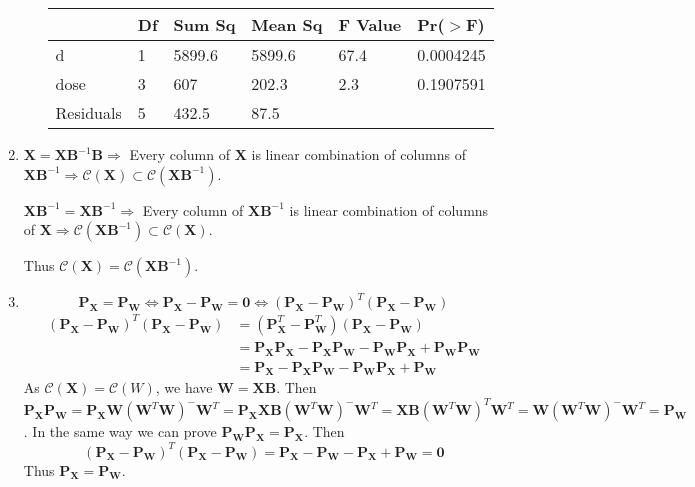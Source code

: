 \documentclass{article}
\begin{document}
\begin{enumerate}[leftmargin = 0 em, label = \arabic*., font = \bfseries]
\begin{enumerate}
	\begin{center}
	\begin{tabular}{llllll}
		\toprule
		& Df & Sum Sq & Mean Sq & F Value & Pr($>$F)\\
		\midrule
	  d & 1 & 5899.6 & 5899.6 & 67.4 & 0.0004245\\
	  dose & 3 & 607 & 202.3 & 2.3 & 0.1907591\\
	  Residuals & 5 & 432.5 & 87.5 & & \\
	  \bottomrule
	\end{tabular}
	\end{center}

	\end{enumerate}

	\item 
	$\bm X = \bm X \bm B^{-1} \bm B \Rightarrow$ Every column of $\bm X$ is linear combination of columns of $\bm X \bm B^{-1} \Rightarrow \mathcal{C}(\bm X) \subset \mathcal{C}(\bm X \bm B^{-1})$.

	$\bm X\bm B^{-1} = \bm X \bm B^{-1} \Rightarrow$ Every column of $\bm X \bm B^{-1}$ is linear combination of columns of $\bm X  \Rightarrow \mathcal{C}(\bm X\bm B^{-1}) \subset \mathcal{C}(\bm X )$.

	Thus $\mathcal{C}(\bm X) = \mathcal{C}(\bm X \bm B^{-1})$.

	\item 
	\[\bm P_{\bm X} = \bm P_{\bm W} \iff \bm P_{\bm X} - \bm P_{\bm W} = \bm 0 \iff (\bm P_{\bm X} - \bm P_{\bm W})^T (\bm P_{\bm X} - \bm P_{\bm W}) \]
	\begin{align*}
	(\bm P_{\bm X} - \bm P_{\bm W})^T (\bm P_{\bm X} - \bm P_{\bm W}) & = (\bm P_{\bm X}^T - \bm P_{\bm W}^T)(\bm P_{\bm X} - \bm P_{\bm W})\\
	& = \bm P_{\bm X} \bm P_{\bm X} - \bm P_{\bm X} \bm P_{\bm W} - \bm P_{\bm W} \bm P_{\bm X} + \bm P_{\bm W}\bm P_{\bm W}\\
	& = \bm P_{\bm X} - \bm P_{\bm X} \bm P_{\bm W} - \bm P_{\bm W} \bm P_{\bm X} + \bm P_{\bm W}
	\end{align*}
	As $\mathcal{C}(\bm X) = \mathcal{C}(W)$, we have $\bm W = \bm X \bm B$. Then $\bm P_{\bm X} \bm P_{\bm W} = \bm P_{\bm X} \bm W (\bm W^T \bm W)^{-} \bm W^T = \bm P_{\bm X} \bm X \bm B (\bm W^T \bm W)^- \bm W^T = \bm X \bm B (\bm W^T \bm W)^T\bm W^T = \bm W(\bm W^T\bm W)^- \bm W^T = \bm P_{\bm W}$. In the same way we can prove $\bm P_{\bm W}\bm P_{\bm X} = \bm P_{\bm X}$. Then
	\[(\bm P_{\bm X} - \bm P_{\bm W})^T (\bm P_{\bm X} - \bm P_{\bm W}) = \bm P_{\bm X} - \bm P_{\bm W} - \bm P_{\bm X} + \bm P_{\bm W} = \bm 0\]
	Thus $\bm P_{\bm X} = \bm P_{\bm W}$.


\end{enumerate}
\end{document}
